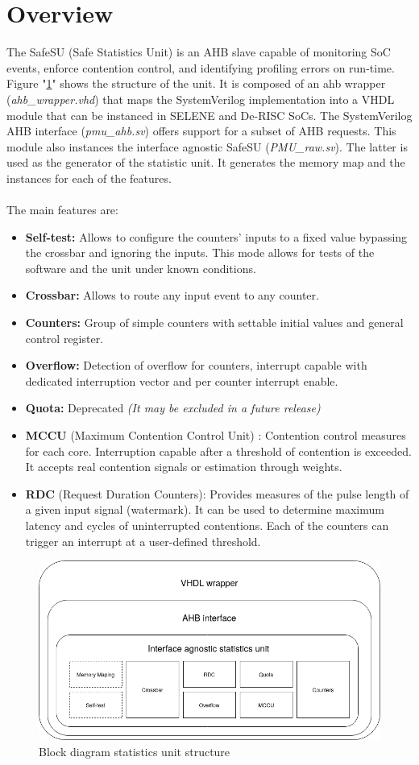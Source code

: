 \newpage
\section{Overview}
\label{chapter1}
The SafeSU (Safe Statistics Unit) is an AHB slave capable of monitoring SoC events, enforce contention control, and identifying profiling errors on run-time.
Figure "\ref{fig:blkdia}" shows the structure of the unit. It is composed of an ahb wrapper (\textit{ahb\_wrapper.vhd}) that maps the SystemVerilog implementation into a VHDL module that can be instanced in SELENE and De-RISC SoCs.  The SystemVerilog AHB interface (\textit{pmu\_ahb.sv}) offers support for a subset of AHB requests. This module also instances the interface agnostic SafeSU (\textit{PMU\_raw.sv}). The latter is used as the generator of the statistic unit. It generates the memory map and the instances for each of the features.\\
\\
The main features are:\\
\begin{itemize}
	\item \textbf{Self-test:} Allows to configure the counters' inputs to a fixed value bypassing the crossbar and ignoring the inputs. This mode allows for tests of the software and the unit under known conditions.
	\item \textbf{Crossbar:} Allows to route any input event to any counter.
	\item \textbf{Counters:} Group of simple counters with settable initial values and general control register.
	\item \textbf{Overflow:} Detection of overflow for counters, interrupt capable with dedicated interruption vector and per counter interrupt enable.
	\item \textbf{Quota:} Deprecated \textit{(It may be excluded in a future release)}
	\item \textbf{MCCU }(Maximum Contention Control Unit) : Contention control measures for each core. Interruption capable after a threshold of contention is exceeded. It accepts real contention signals or estimation through weights.
	\item \textbf{RDC }(Request Duration Counters): Provides measures of the pulse length of a given input signal (watermark). It can be used to determine maximum latency and cycles of uninterrupted contentions. Each of the counters can trigger an interrupt at a user-defined threshold.
\end{itemize}

\begin{figure}[H]
	\includegraphics[keepaspectratio,width=\columnwidth]{img/GRLIB_SU.png}
	\caption{Block diagram statistics unit structure}
	\label{fig:blkdia}
\end{figure}
